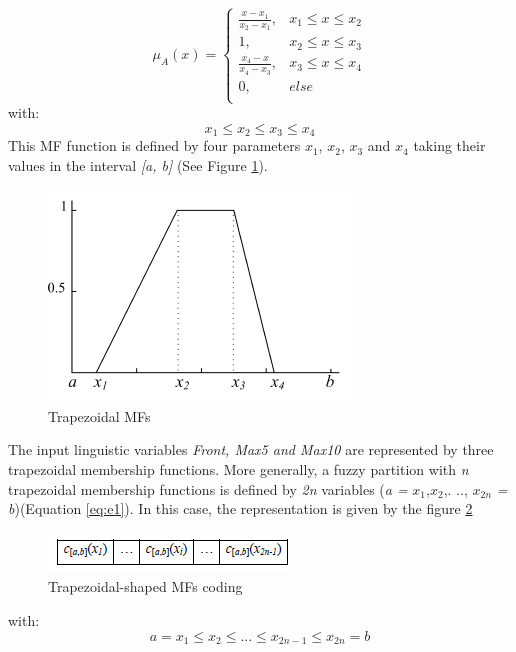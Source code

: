 \documentclass[runningheads,a4paper]{llncs}
\begin{document}
\begin{equation}
\mu_{A}(x)= \left \{
\begin{array}{ll}
\frac{x - x_{1}}{x_{2} - x_{1}},& x_{1} \leq x \leq x_{2}\\
1 , &x_{2} \leq x \leq x_{3}\\
\frac{x_{4} - x}{x_{4} - x_{3}},& x_{3} \leq x \leq x_{4}\\
0        ,& else\\	
\end{array}
\right.
\label{eq:trapmf}
\end{equation}
with:
\begin{equation}
x_{1} \leq x_{2} \leq x_{3} \leq x_{4}
\end{equation}
This MF function is defined by four parameters $x_{1}$, $x_{2}$, $x_{3}$ and $x_{4}$ taking their values in the interval \textit{[a, b]} (See Figure \ref{fig:trapeze}).																			
\begin{figure}[!ht] 
	\begin{center}
		\includegraphics[scale=0.95]{fig/trapese}
		\caption {Trapezoidal MFs}
		\label{fig:trapeze}
	\end{center}
\end{figure}
The input  linguistic variables \textit{Front, Max5 and Max10}  are represented by three trapezoidal membership functions.
More generally, a fuzzy partition with \textit{n} trapezoidal membership functions is defined by \textit{2n} variables (\textit{a =} $ x_{1}$,$x_{2} $,. .., $x_{2n} $ \textit {= b})(Equation \ref{eq:e1}). In this case, the representation is given by the figure \ref{fig:at}
\begin{figure}[!ht] 
	\begin{center}
		\includegraphics[scale=0.95]{fig/at}
		\caption {Trapezoidal-shaped MFs coding}
		\label{fig:at}
	\end{center}
\end{figure}
with:
\begin{equation}
a = x_{1} \leq x_{2} \leq...\leq x_{2n-1} \leq x_{2n}=b 	
\end{equation}		
\end{document}
